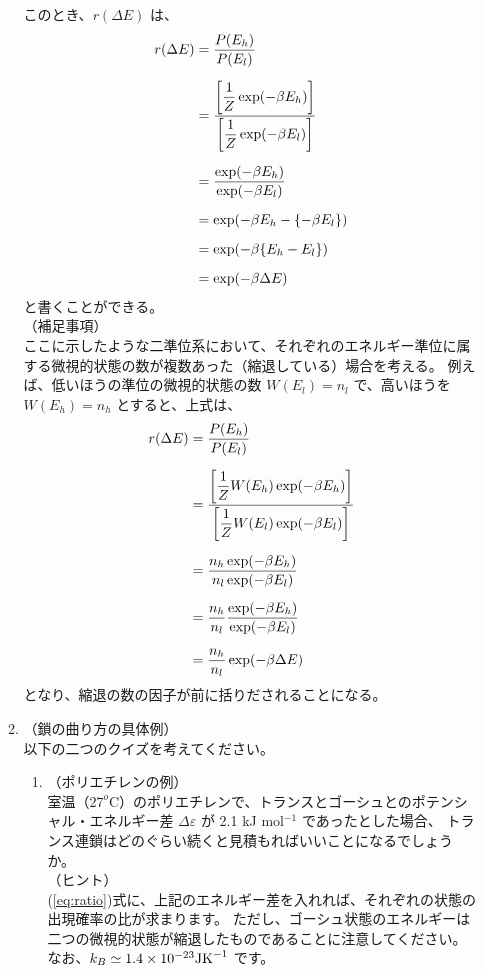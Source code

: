 \documentclass[11pt]{jsarticle}
\begin{document}
\begin{itemize}
\begin{enumerate}
		このとき、$r(\Delta E)$ は、
		\begin{align*}
		r(\Delta E)
			&= \dfrac{P(E_h)}{P(E_l)} \notag \\[6pt]
			&=\dfrac{\left[ \dfrac{1}{Z} \exp(-\beta E_h) \right] }{\left[ \dfrac{1}{Z} \exp(-\beta E_l) \right]} \notag \\[6pt]
			&=\dfrac{\exp(-\beta E_h) }{\exp(-\beta E_l)} \notag \\[6pt]
			&=\exp(-\beta E_h - \{-\beta E_l \}) \notag \\[6pt]
			&=\exp(-\beta \{E_h - E_l \}) \notag \\[6pt]
			&=\exp(-\beta \Delta E)
		\end{align*}
		と書くことができる。\\
		（補足事項）\\
		ここに示したような二準位系において、それぞれのエネルギー準位に属する微視的状態の数が複数あった（縮退している）場合を考える。
		例えば、低いほうの準位の微視的状態の数 $W(E_l) = n_l$ で、高いほうを $W(E_h) = n_h$ とすると、上式は、
		\begin{align*}
		r(\Delta E)
			&= \dfrac{P(E_h)}{P(E_l)} \notag \\[6pt]
			&=\dfrac{\left[ \dfrac{1}{Z} W(E_h) \exp(-\beta E_h) \right] }{\left[ \dfrac{1}{Z} W(E_l) \exp(-\beta E_l) \right]} \notag \\[6pt]
			&=\dfrac{n_h \exp(-\beta E_h) }{n_l \exp(-\beta E_l)} \notag \\[6pt]
			&=\dfrac{n_h}{n_l} \dfrac{\exp(-\beta E_h) }{\exp(-\beta E_l)} \notag \\[6pt]
			&=\dfrac{n_h}{n_l} \exp(-\beta \Delta E)
		\end{align*}
		となり、縮退の数の因子が前に括りだされることになる。

		\item
		（鎖の曲り方の具体例）\\
		以下の二つのクイズを考えてください。

		\begin{enumerate}
			\item
			（ポリエチレンの例）\\
			室温（$27^o$C）のポリエチレンで、トランスとゴーシュとのポテンシャル・エネルギー差 $\Delta \varepsilon$ が 2.1 kJ mol$^{-1}$ であったとした場合、
			トランス連鎖はどのぐらい続くと見積もればいいことになるでしょうか。\\
			（ヒント）\\
			(\ref{eq:ratio})式に、上記のエネルギー差を入れれば、それぞれの状態の出現確率の比が求まります。
			ただし、ゴーシュ状態のエネルギーは二つの微視的状態が縮退したものであることに注意してください。
			なお、$k_B \simeq 1.4 \times 10^{-23} {\rm J K}^{-1}$ です。 


\end{enumerate}
\end{enumerate}
\end{itemize}
\end{document}
